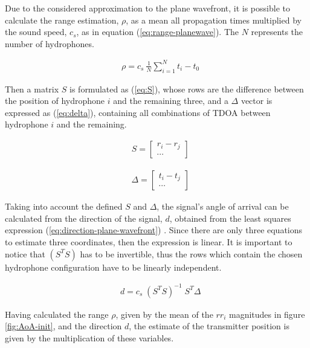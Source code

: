Due to the considered approximation to the plane wavefront, it is possible to calculate the range estimation, $\rho$, as a mean all propagation times multiplied by the sound speed, $c_s$, as in equation (\ref{eq:range-planewave}). The $N$ represents the number of hydrophones.

\begin{eqnarray}
& \rho = c_s\ \frac{1}{N} \displaystyle\sum_{i=1}^{N} t_{i} - t_0
\label{eq:range-planewave}
\end{eqnarray}

Then a matrix $S$ is formulated as (\ref{eq:S}), whose rows are the difference between the position of hydrophone $i$ and the remaining three, and a $\Delta$ vector is expressed as (\ref{eq:delta}), containing all combinations of TDOA between hydrophone $i$ and the remaining.

\begin{eqnarray}
	& S = 
	\begin{bmatrix}
		r_i - r_j \\
		\cdots 
	\end{bmatrix}
	\label{eq:S}
\end{eqnarray}

\begin{eqnarray}
	& \Delta = 
	\begin{bmatrix}
		t_i - t_j \\
		\cdots 
	\end{bmatrix}
	\label{eq:delta}
\end{eqnarray}

Taking into account the defined $S$ and $\Delta$, the signal's angle of arrival can be calculated from the direction of the signal, $d$, obtained from the least squares expression (\ref{eq:direction-plane-wavefront}) \cite{estim-plane-wavefront}. Since there are only three equations to estimate three coordinates, then the expression is linear. It is important to notice that $(S^TS)$ has to be invertible, thus the rows which contain the chosen hydrophone configuration have to be linearly independent.

\begin{eqnarray}
& d = c_s \; (S^{T}S)^{-1} \; S^{T} \Delta
\label{eq:direction-plane-wavefront}
\end{eqnarray}

Having calculated the range $\rho$, given by the mean of the $rr_i$ magnitudes in figure \ref{fig:AoA-init}, and the direction $d$, the estimate of the transmitter position is given by the multiplication of these variables.


